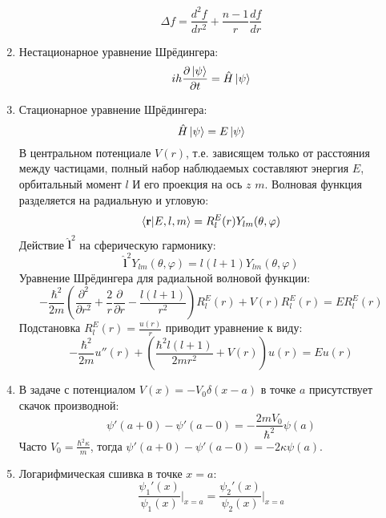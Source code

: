 \documentclass[12pt]{article}
\theoremstyle{definition}
\begin{document}
\begin{enumerate}
    \begin{equation}
        \Delta f=\frac{d^2f}{dr^2}+\frac{n-1}{r}\frac{df}{dr}
    \end{equation}
    \item Нестационарное уравнение Шрёдингера:
    \begin{equation}
        ih\frac{\partial\ket{\psi}}{\partial t}=\hat{H}\ket{\psi}
    \end{equation}
    \item Стационарное уравнение Шрёдингера:
    \begin{equation}
        \hat{H}\ket{\psi}=E\ket{\psi}
    \end{equation}
    В центральном потенциале $V(r)$, т.е. зависящем только от расстояния между частицами, полный набор наблюдаемых составляют энергия $E$, орбитальный момент $l$ И его проекция на ось $z$ $m$. Волновая функция разделяется на радиальную и угловую:
    \begin{equation}
        \braket{\textbf{r}|E,l,m}=R^E_l(r)Y_{lm}(\theta,\varphi)
    \end{equation}
    Действие $\hat{\textbf{l}}^2$ на сферическую гармонику:
    \begin{equation}
        \hat{\textbf{l}}^2Y_{lm}(\theta,\varphi)=l(l+1)Y_{lm}(\theta,\varphi)
    \end{equation}
    Уравнение Шрёдингера для радиальной волновой функции:
    \begin{equation}
        -\frac{\hbar^2}{2m}\left(\frac{\partial^2}{\partial r^2}+\frac{2}{r}\frac{\partial}{\partial r}-\frac{l(l+1)}{r^2}\right)R^E_l(r)+V(r)R^E_l(r)=ER^E_l(r)
    \end{equation}
    Подстановка $R^E_l(r)=\frac{u(r)}{r}$ приводит уравнение к виду:
    \begin{equation}
        -\frac{\hbar^2}{2m}u''(r)+\left(\frac{\hbar^2l(l+1)}{2mr^2}+V(r)\right)u(r)=Eu(r)
    \end{equation}
    \item В задаче с потенциалом $V(x)=-V_0\delta(x-a)$ в точке $a$ присутствует скачок производной:
    \begin{equation}
        \psi'(a+0)-\psi'(a-0)=-\frac{2mV_0}{\hbar^2}\psi(a)
    \end{equation}
    Часто $V_0=\frac{\hbar^2\kappa}{m}$, тогда $\psi'(a+0)-\psi'(a-0)=-2\kappa\psi(a)$.
    \item Логарифмическая сшивка в точке $x=a$:
    \begin{equation}
        \frac{\psi_1'(x)}{\psi_1(x)}\bigg|_{x=a}=\frac{\psi_2'(x)}{\psi_2(x)}\bigg|_{x=a}

\end{equation}
\end{enumerate}
\end{document}
